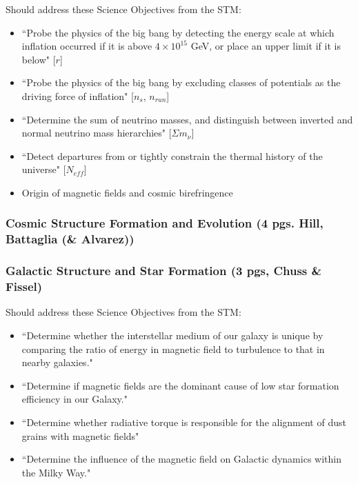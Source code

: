 \documentclass[12pt]{article}
\begin{document}
        Should address these Science Objectives from the STM:
        \begin{itemize}
        \item ``Probe the physics of the big bang by detecting the energy scale at which inflation occurred if it is above $4\times10^{15}$ GeV, or place an upper limit if it is below" [$r$]
        \item ``Probe the physics of the big bang by excluding classes of potentials as the driving force of inflation" [$n_s$, $n_{run}$]
        \item ``Determine the sum of neutrino masses, and distinguish between inverted and normal neutrino mass hierarchies" [$\Sigma m_{\nu}$]
        \item ``Detect departures from or tightly constrain the thermal history of the universe" [$N_{eff}$]
        \item Origin of magnetic fields and cosmic birefringence
        \end{itemize} 




\subsubsection{Cosmic Structure Formation and Evolution (4 pgs. Hill, Battaglia (\& Alvarez))}



\subsubsection{Galactic Structure and Star Formation (3 pgs, Chuss \& Fissel)}

Should address these Science Objectives from the STM:
        \begin{itemize}
        \item ``Determine whether the interstellar medium of our galaxy is unique by comparing the ratio of energy in magnetic field to turbulence to that in nearby galaxies."
        \item ``Determine if magnetic fields are the dominant cause of low star formation efficiency in our Galaxy."
        \item ``Determine whether radiative torque is responsible for the alignment of dust grains with magnetic fields"
        \item ``Determine the influence of the magnetic field on Galactic dynamics within the Milky Way."
        \end{itemize}
\end{document}
